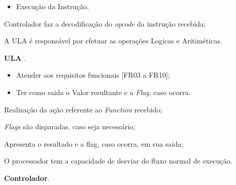 \documentclass{article}
\begin{document}
  \postconditions
    \begin{itemize}
     \item Execução da Instrução.
    \end{itemize}

  
  \begin{mainflow}
    \item Controlador faz a decodificação do \textit{opcode} da instrução recebida;
  \end{mainflow}

  A ULA é responsável por efetuar as operações Logicas e Aritiméticas.
  
  \actors
    \begin{description}
     \item \textbf{ULA} .
    \end{description}
    
  \preconditions 
    \begin{itemize}
     \item Atender aos requisitos funcionais [FR03 a FR10];
    \end{itemize}

  \postconditions
    \begin{itemize}
     \item Ter como saida o Valor resultante e a  \textit{Flag}, caso ocorra.
    \end{itemize}
  
  
  \begin{mainflow}
    \item Realização da ação referente ao   \textit{Function} recebido;
    \item \textit{Flags} são disparadas, caso seja necessário;
    \item Apresenta o resultado e a flag, caso ocorra, em sua saida;
  \end{mainflow}

   O processador tem a capacidade de desviar do fluxo normal de execução.
  
  \actors
    \begin{description}
     \item \textbf{Controlador}.
    \end{description}
    
\end{document}
